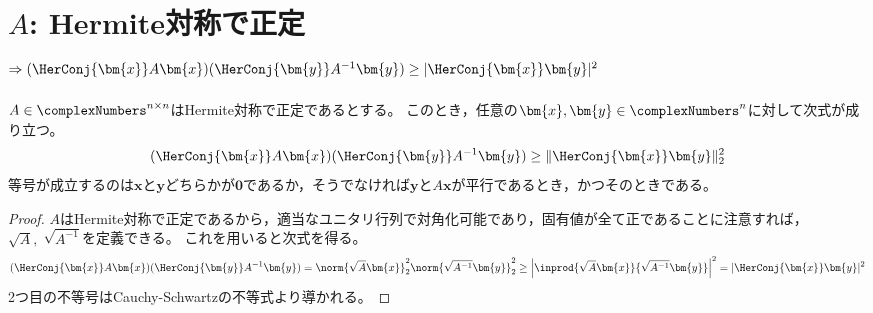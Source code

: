     \section{\texorpdfstring{$A$}{A}: Hermite対称で正定\texorpdfstring{$\Rightarrow (\HerConj{\bm{x}}A\bm{x})(\HerConj{\bm{y}}A^{-1}\bm{y}) \geq |\HerConj{\bm{x}}\bm{y}|^2$}{⇒ (x\string^*Ax)(y\string^*A\string^(-1)y) ≧ |x\string^*y|\string^2}}
        \begin{shadebox}
            $A \in \complexNumbers^{n\times n}$はHermite対称で正定であるとする。
            このとき，任意の$\bm{x}, \bm{y} \in \complexNumbers^n$に対して次式が成り立つ。
            \[ (\HerConj{\bm{x}}A\bm{x})(\HerConj{\bm{y}}A^{-1}\bm{y}) \geq \|\HerConj{\bm{x}}\bm{y}\|_2^2 \]
            等号が成立するのは$\bm{x}$と$\bm{y}$どちらかが$\bm{0}$であるか，そうでなければ$\bm{y}$と$A\bm{x}$が平行であるとき，かつそのときである。
        \end{shadebox}
        \begin{proof}
            \quad\par
            $A$はHermite対称で正定であるから，適当なユニタリ行列で対角化可能であり，固有値が全て正であることに注意すれば，$\sqrt{A},\;\sqrt{A^{-1}}$を定義できる。
            これを用いると次式を得る。
            \[ (\HerConj{\bm{x}}A\bm{x})(\HerConj{\bm{y}}A^{-1}\bm{y}) = \norm{\sqrt{A}\bm{x}}_2^2 \norm{\sqrt{A^{-1}}\bm{y}}_2^2 \geq \left|\inprod{\sqrt{A}\bm{x}}{\sqrt{A^{-1}}\bm{y}}\right|^2 = |\HerConj{\bm{x}}\bm{y}|^2 \]
            2つ目の不等号はCauchy-Schwartzの不等式より導かれる。
        \end{proof}